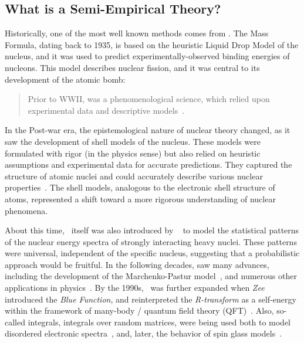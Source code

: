 \subsection{What is a Semi-Empirical Theory?}

Historically, one of the most well known \emph{\SemiEmpirical} methods comes from \NuclearPhysics.
The \SemiEmpirical Mass Formula, dating back to 1935, is based on the heuristic Liquid Drop Model of the nucleus,
and it was used to predict experimentally-observed binding energies of nucleons. 
This model describes nuclear fission, and it was central to its development of the atomic bomb:
\begin{quote}
  Prior to WWII, \NuclearPhysics was a phenomenological science, which relied upon experimental data and descriptive
  models~\cite{Negele05}.
\end{quote}
In the Post-war era, the epistemological nature of nuclear theory changed,
as it saw the development of \SemiEmpirical shell models of the nucleus.
These models were formulated with rigor (in the physics sense)
but also relied on heuristic assumptions and experimental data for accurate predictions.
They captured the structure of atomic nuclei
and could accurately describe various nuclear properties~\cite{Ivanenko1932, GoeppertMayer1949, Jensen1949}.
The shell models, analogous to the electronic shell structure of atoms,
represented a shift toward a more rigorous understanding of nuclear phenomena.

About this time, \RMT~itself was also introduced by \emph{\Wigner}~\cite{Wigner55}
to model the statistical patterns of the nuclear energy spectra of strongly interacting heavy nuclei.
These patterns were universal, independent of the specific nucleus,
suggesting that a probabilistic approach would be fruitful.
In the following decades, \RMT saw many advances, including the development of
the Marchenko-Pastur model~\cite{MarchenkoPastur1967},
and numerous other applications in physics~\cite{Guhr1998}.
By the 1990s, \RMT~was further expanded when \emph{Zee} introduced the \emph{Blue Function},
and reinterpreted the \emph{R-transform} as a self-energy within the
framework of many-body / quantum field theory (QFT)~\cite{Zee1996}.
Also, so-called \HCIZtext integrals, integrals over random matrices,
were being used both to model disordered electronic spectra~\cite{SchultenRMT},
and, later, the behavior of spin glass models~\cite{Bouchaud1998,Cherrier_2003}.

